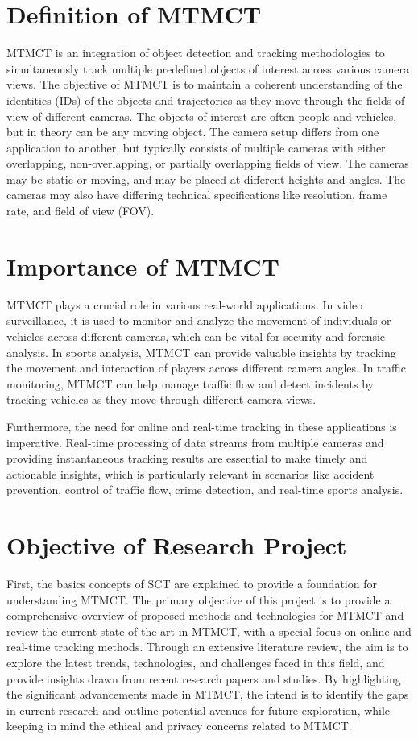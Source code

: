 \section{Definition of MTMCT}\label{sec:definition_of_mtmct}
MTMCT is an integration of object detection and tracking methodologies to simultaneously track multiple predefined objects of interest across various camera views. The objective of MTMCT is to maintain a coherent understanding of the identities (IDs) of the objects and trajectories as they move through the fields of view of different cameras. The objects of interest are often people and vehicles, but in theory can be any moving object. The camera setup differs from one application to another, but typically consists of multiple cameras with either overlapping, non-overlapping, or partially overlapping fields of view. The cameras may be static or moving, and may be placed at different heights and angles. The cameras may also have differing technical specifications like resolution, frame rate, and field of view (FOV).

\section{Importance of MTMCT}\label{sec:importance_of_mtmct}
MTMCT plays a crucial role in various real-world applications. In video surveillance, it is used to monitor and analyze the movement of individuals or vehicles across different cameras, which can be vital for security and forensic analysis. In sports analysis, MTMCT can provide valuable insights by tracking the movement and interaction of players across different camera angles. In traffic monitoring, MTMCT can help manage traffic flow and detect incidents by tracking vehicles as they move through different camera views.

Furthermore, the need for online and real-time tracking in these applications is imperative. Real-time processing of data streams from multiple cameras and providing instantaneous tracking results are essential to make timely and actionable insights, which is particularly relevant in scenarios like accident prevention, control of traffic flow, crime detection, and real-time sports analysis.

\section{Objective of Research Project}\label{sec:objective_of_review}
First, the basics concepts of SCT are explained to provide a foundation for understanding MTMCT. The primary objective of this project is to provide a comprehensive overview of proposed methods and technologies for MTMCT and review the current state-of-the-art in MTMCT, with a special focus on online and real-time tracking methods. Through an extensive literature review, the aim is to explore the latest trends, technologies, and challenges faced in this field, and provide insights drawn from recent research papers and studies. By highlighting the significant advancements made in MTMCT, the intend is to identify the gaps in current research and outline potential avenues for future exploration, while keeping in mind the ethical and privacy concerns related to MTMCT.

